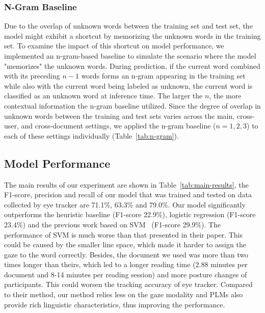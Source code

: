 \subsubsection{N-Gram Baseline}
\label{sec:experiment_n-gram}
Due to the overlap of unknown words between the training set and test set, the model might exhibit a shortcut by memorizing the unknown words in the training set. To examine the impact of this shortcut on model performance, we implemented an n-gram-based baseline to simulate the scenario where the model "memorizes" the unknown words. During prediction, if the current word combined with its preceding $n - 1$ words forms an n-gram appearing in the training set while also with the current word being labeled as unknown, the current word is classified as an unknown word at inference time. The larger the $n$, the more contextual information the n-gram baseline utilized. Since the degree of overlap in unknown words between the training and test sets varies across the main, cross-user, and cross-document settings, we applied the n-gram baseline ($n=1,2,3$) to each of these settings individually (Table~\ref{tab:n-gram}).
% 



\subsection{Model Performance}
\label{sec:main_result}


The main results of our experiment are shown in Table~\ref{tab:main-results}, the F1-score, precision and recall of our model that was trained and tested on data collected by eye tracker are 71.1\%, 63.3\% and 79.0\%. Our model significantly outperforms the heuristic baseline (F1-score 22.9\%), logistic regression (F1-score 23.4\%) and the previous work based on SVM~\cite{gaze-text_garain_2017} (F1-score 29.9\%). The performance of SVM is much worse than that presented in their paper. This could be caused by the smaller line space, which made it harder to assign the gaze to the word correctly. Besides, the document we used was more than two times longer than theirs, which led to a longer reading time (2.88 minutes per document and 8-14 minutes per reading session) and more posture changes of participants. This could worsen the tracking accuracy of eye tracker. Compared to their method, our method relies less on the gaze modality and PLMs also provide rich linguistic characteristics, thus improving the performance.


